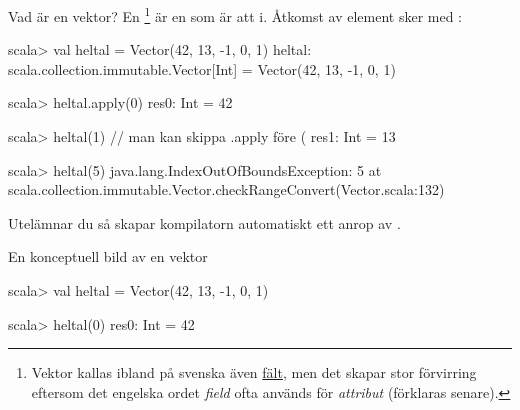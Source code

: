 \begin{Slide}{Vad är en vektor?}\SlideFontSmall
En \footnote{Vektor kallas ibland på svenska även \href{https://sv.wikipedia.org/wiki/F\%C3\%A4lt_\%28datastruktur\%29}{fält}, men det skapar stor förvirring eftersom det engelska ordet \emph{field} ofta används för \emph{attribut} (förklaras senare).}
 är en  som är  att  i.
Åtkomst av element sker med :

\begin{REPL}
scala> val heltal = Vector(42, 13, -1, 0, 1)
heltal: scala.collection.immutable.Vector[Int] = Vector(42, 13, -1, 0, 1)

scala> heltal.apply(0)
res0: Int = 42

scala> heltal(1)    // man kan skippa .apply före (
res1: Int = 13

scala> heltal(5)
java.lang.IndexOutOfBoundsException: 5
  at scala.collection.immutable.Vector.checkRangeConvert(Vector.scala:132)
\end{REPL}
Utelämnar du  så skapar kompilatorn automatiskt ett anrop av .
\end{Slide}

\begin{Slide}{En konceptuell bild av en vektor}

\begin{REPLnonum}
scala> val heltal = Vector(42, 13, -1, 0, 1)

scala> heltal(0)
res0: Int = 42
\end{REPLnonum}


\end{Slide}



